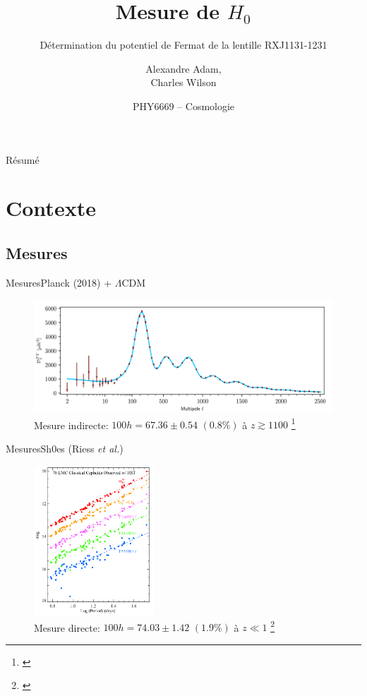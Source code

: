 \documentclass{beamer}
\institute[] %
{
		Département de Physique\\
		Université de Montréal
}
\title{Mesure de $H_0$}
\subtitle{Détermination du potentiel de Fermat de la lentille RXJ1131-1231}
\author{Alexandre Adam, \\ 
        Charles Wilson}
\date{PHY6669 -- Cosmologie}
\begin{document}
\begin{frame}
	\titlepage
\end{frame}


\begin{frame}{Résumé}
	\tableofcontents
\end{frame}

\section{Contexte}
\subsection{Mesures}

\begin{frame}{Mesures}{Planck (2018) + $\Lambda$CDM}
        \begin{figure}[H]
                \centering
                \includegraphics[width=\textwidth]{TT_power_spectra_Planck2018}
                \caption{Mesure indirecte: $\boxed{100h = 67.36 
                        \pm 0.54\,\, (0.8\%)}$ à $z \gtrsim 1100$
                \footnote{\citet{PlanckCollaboration2018}}}
        \end{figure}
        	
\end{frame}

\begin{frame}{Mesures}{Sh0es (Riess \textit{et al.})}
        \begin{figure}[H]
                \centering
                \includegraphics[width=0.4\textwidth]{Sh0es_mesure}
                \caption{Mesure directe: $\boxed{100h = 74.03 \pm 1.42\,\,(1.9\%)}$ à $z\ll 1$
                \footnote{\citet{Riess2019}}}
        \end{figure}
\end{frame}
\end{document}
